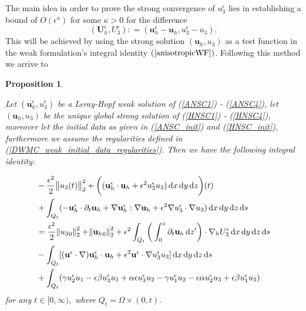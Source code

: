 \documentclass[11pt]{article}
\newtheorem{prop}{Proposition}
\newcommand*\diff{\mathop{}\!\mathrm{d}}
\begin{document}
The main idea in order to prove the strong convergence of $u^\epsilon_3$ lies in establishing a bound of $O(\epsilon^\kappa)$ for some $\kappa>0$ for the difference \begin{equation}\label{velocitydifferencefunctions}(\mathbf{U}_h^\epsilon, U_3^\epsilon): = (\mathbf{u}_h^\epsilon - \mathbf{u}_h, u_3^\epsilon - u_3).\end{equation} This will be achieved by using the strong solution $(\mathbf{u}_h,u_3)$ as a test function in the weak formulation's integral identity $(\ref{anisotropicWF})$. Following this method we arrive to

\begin{prop} \label{propIdentity}

Let $(\mathbf{u}_h^\epsilon, u_3^\epsilon)$ be a Leray-Hopf weak solution of (\ref{ANSC1}) - (\ref{ANSC4}), let $(\mathbf{u}_h,u_3)$ be the unique global strong solution of (\ref{HNSC1}) - (\ref{HNSC4}), moreover let the initial data as given in (\ref{ANSC_init}) and (\ref{HNSC_init}), furthermore we assume the regularities defined in (\ref{DWMC_weak_initial_data_regularities}). Then we have the following integral identity:

\begin{equation} \label{integralIdentity_prop}
\begin{split}
& - \frac{\epsilon^2}{2} \norm{u_3(t)}_2^2 + \bigg ( (\mathbf{u}_h^\epsilon \cdot \mathbf{u}_h + \epsilon^2 u_3^\epsilon u_3) \diff x \diff y \diff z \bigg ) (t) \\
& + \int_{Q_t} (-\mathbf{u}_h^\epsilon \cdot \partial_t \mathbf{u}_h + \nabla \mathbf{u}_h^\epsilon : \nabla \mathbf{u}_h + \epsilon^2 \nabla u_3^\epsilon \cdot \nabla u_3) \diff x \diff y \diff z \diff s \\
& = \frac{\epsilon^2}{2} \norm{{u_3}_0}_2^2 + \norm{{\mathbf{u}_h}_0}_2^2 + \epsilon^2 \int_{Q_t} \bigg ( \int_0^z \partial_t \mathbf{u}_h \diff z' \bigg ) \cdot \nabla_h U_3^\epsilon \diff x \diff y \diff z \diff s \\
& - \int_{Q_t} [(\mathbf{u}^\epsilon \cdot \nabla) \mathbf{u}_h^\epsilon \cdot \mathbf{u}_h + \epsilon^2 \mathbf{u}^\epsilon \cdot \nabla u_3^\epsilon u_3] \diff x \diff y \diff z \diff s \\
& + \int_{Q_t} ( \gamma u_2^\epsilon u_1 - \epsilon \beta u_3^\epsilon u_1 + \alpha \epsilon u_3^\epsilon u_2 - \gamma u_1^\epsilon u_2 - \epsilon \alpha u^\epsilon_2 u_3 + \epsilon \beta u_1^\epsilon u_3)
\end{split}
\end{equation}
%
for any $t \in [0, \infty),$ where $Q_t = \Omega \times (0,t).$

\end{prop}
\end{document}
